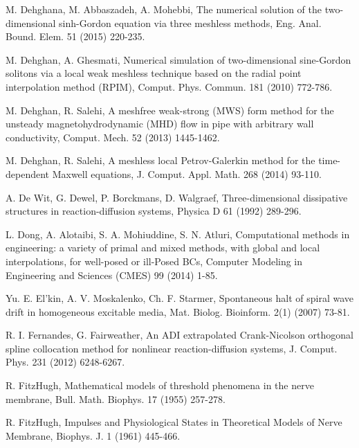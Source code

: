 \documentclass[12pt]{article}
\numberwithin{equation}{section}
\begin{document}
\begin{thebibliography}{99}
 M. Dehghana, M. Abbaszadeh, A. Mohebbi, The numerical solution of the two-dimensional sinh-Gordon equation via three
meshless methods, Eng. Anal. Bound. Elem. 51 (2015) 220-235.


 M. Dehghan, A. Ghesmati, Numerical simulation of two-dimensional sine-Gordon solitons via a local weak meshless technique based 
on the radial point interpolation method (RPIM), Comput. Phys. Commun. 181 (2010) 772-786.

 M. Dehghan, R. Salehi, A meshfree weak-strong (MWS) form method for the unsteady magnetohydrodynamic (MHD) flow in pipe with arbitrary wall conductivity, Comput. Mech. 52 (2013) 1445-1462.

 M. Dehghan, R. Salehi, A meshless local Petrov-Galerkin method for the time-dependent Maxwell equations, J. Comput. Appl. Math.  
268 (2014) 93-110.

 A. De Wit, G. Dewel, P. Borckmans, D. Walgraef, Three-dimensional dissipative structures in reaction-diffusion systems, 
Physica D 61 (1992) 289-296.

 L. Dong, A. Alotaibi, S. A. Mohiuddine, S. N. Atluri, Computational methods in engineering: a variety of primal and mixed methods, with global and local interpolations, for well-posed or ill-Posed BCs,  Computer Modeling in Engineering and Sciences (CMES) 99 (2014) 1-85.

 Yu. E. El'kin, A. V. Moskalenko, Ch. F. Starmer, Spontaneous halt of spiral wave drift in homogeneous excitable media, Mat. Biolog. Bioinform. 2(1) (2007) 73-81.

 R. I. Fernandes, G. Fairweather,  An ADI extrapolated Crank-Nicolson orthogonal spline collocation
method for nonlinear reaction-diffusion systems, J. Comput. Phys. 231 (2012) 6248-6267.

 R. FitzHugh, Mathematical models of threshold phenomena in the nerve membrane, Bull. Math. Biophys.
17 (1955) 257-278.

 R. FitzHugh, Impulses and Physiological States in Theoretical Models of Nerve Membrane, Biophys. J. 1 (1961)
445-466.


\end{thebibliography}
\end{document}
